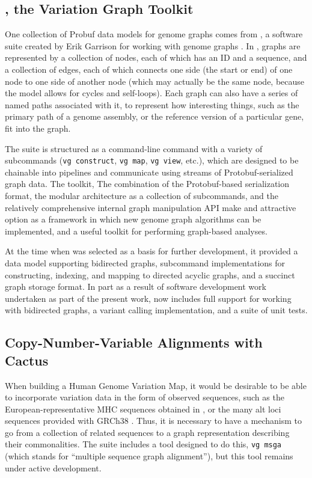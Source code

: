 \subsection{\vg, the Variation Graph Toolkit}


One collection of Probuf data models for genome graphs comes from \vg, a software suite created by Erik Garrison for working with genome graphs \cite{garrison2016vg}. In \vg, graphs are represented by a collection of nodes, each of which has an ID and a sequence, and a collection of edges, each of which connects one side (the start or end) of one node to one side of another node (which may actually be the same node, because the \vg model allows for cycles and self-loops). Each graph can also have a series of named paths associated with it, to represent how interesting things, such as the primary path of a genome assembly, or the reference version of a particular gene, fit into the graph.

The \vg suite is structured as a command-line \vg command with a variety of subcommands (\texttt{vg construct}, \texttt{vg map}, \texttt{vg view}, etc.), which are designed to be chainable into pipelines and communicate using streams of Protobuf-serialized graph data. The toolkit, The combination of the Protobuf-based serialization format, the modular architecture as a collection of subcommands, and the relatively comprehensive internal graph manipulation API make \vg and attractive option as a framework in which new genome graph algorithms can be implemented, and a useful toolkit for performing graph-based analyses.

At the time when \vg was selected as a basis for further development, it provided a data model supporting bidirected graphs, subcommand implementations for constructing, indexing, and mapping to directed acyclic graphs, and a succinct graph storage format. In part as a result of software development work undertaken as part of the present work, \vg now includes full support for working with bidirected graphs, a variant calling implementation, and a suite of unit tests.

\subsection{Copy-Number-Variable Alignments with Cactus}

When building a Human Genome Variation Map, it would be desirable to be able to incorporate variation data in the form of observed sequences, such as the European-representative MHC sequences obtained in \citet{horton2008variation}, or the many alt loci sequences provided with GRCh38 \cite{karolchik2014new}. Thus, it is necessary to have a mechanism to go from a collection of related sequences to a graph representation describing their commonalities. The \vg suite includes a tool designed to do this, \texttt{vg msga} (which stands for ``multiple sequence graph alignment''), but this tool remains under active development.


